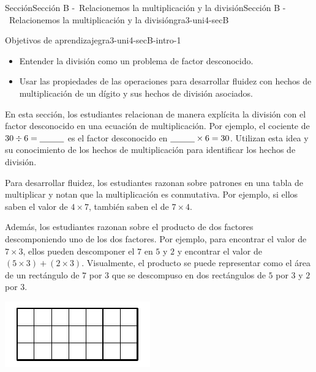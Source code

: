 \documentclass[oneside,10pt,]{article}
\begin{document}
\begin{sectionptx}{Sección}{Sección B -~Relacionemos la multiplicación y la división}{}{Sección B -~Relacionemos la multiplicación y la división}{}{}{gra3-uni4-secB}
\begin{introduction}{}%
\begin{objectives}{Objetivos de aprendizaje}{gra3-uni4-secB-intro-1}
%
\begin{itemize}[label=\textbullet]
\item{}Entender la división como un problema de factor desconocido.%
\item{}Usar las propiedades de las operaciones para desarrollar fluidez con hechos de multiplicación de un dígito y sus hechos de división asociados.%
\end{itemize}
\end{objectives}
En esta sección, los estudiantes relacionan de manera explícita la división con el factor desconocido en una ecuación de multiplicación. Por ejemplo, el cociente de \(30 \div 6 = \underline{\hspace{1 cm}}\) es el factor desconocido en \(\underline{\hspace{1 cm}} \times 6 = 30\). Utilizan esta idea y su conocimiento de los hechos de multiplicación para identificar los hechos de división.%
\par
Para desarrollar fluidez, los estudiantes razonan sobre patrones en una tabla de multiplicar y notan que la multiplicación es conmutativa. Por ejemplo, si ellos saben el valor de \(4 \times 7\), también saben el de \(7 \times 4\).%
\par
Además, los estudiantes razonan sobre el producto de dos factores descomponiendo uno de los dos factores. Por ejemplo, para encontrar el valor de \(7 \times 3\), ellos pueden descomponer el \(7\) en \(5\) y \(2\) y encontrar el valor de \((5 \times 3) + (2 \times 3)\). Visualmente, el producto se puede representar como el área de un rectángulo de \(7\) por \(3\) que se descompuso en dos rectángulos de \(5\) por \(3\) y \(2\) por \(3\).%
\begin{image}{0}{1}{0}{}%
\includegraphics[width=\linewidth]{external/svg-source/tikz-file-147474.pdf}

\end{image}
\end{introduction}
\end{sectionptx}
\end{document}
